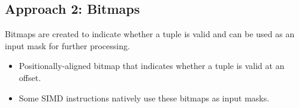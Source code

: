 \documentclass[11pt]{article}
\begin{document}
\subsection{Approach 2: Bitmaps}
Bitmaps are created to indicate whether a tuple is valid and can be used as an input mask for further processing.
\begin{itemize}
    \item Positionally-aligned bitmap that indicates whether a tuple is valid at an offset. 
    \item Some SIMD instructions natively use these bitmaps as input masks.
\end{itemize}

\newpage


\end{document}
